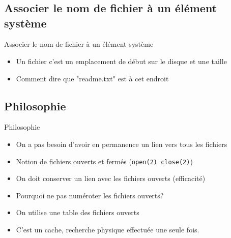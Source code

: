 \section{\sectitle}
\begin{frame}{\sectitle}
\def\subsectitle{Associer le nom de fichier à un élément système}
\subsection{\subsectitle}
\begin{block}{\subsectitle}
\begin{itemize}
    \item Un fichier c'est un emplacement de début sur le disque et une taille
    \item Comment dire que "readme.txt" est à cet endroit
\end{itemize}
\end{block}

\def\subsectitle{Philosophie}
\subsection{\subsectitle}
\begin{block}{\subsectitle}
\begin{itemize}
    \item On a pas besoin d'avoir en permanence un lien vers tous les fichiers
    \item Notion de fichiers ouverts et fermés (\texttt{open(2) close(2)})
    \item On doit conserver un lien avec les fichiers ouverts (efficacité)
    \item Pourquoi ne pas numéroter les fichiers ouverts?
    \item On utilise une table des fichiers ouverts
    \item C'est un cache, recherche physique effectuée une seule fois.
\end{itemize}
\end{block}

\end{frame}


